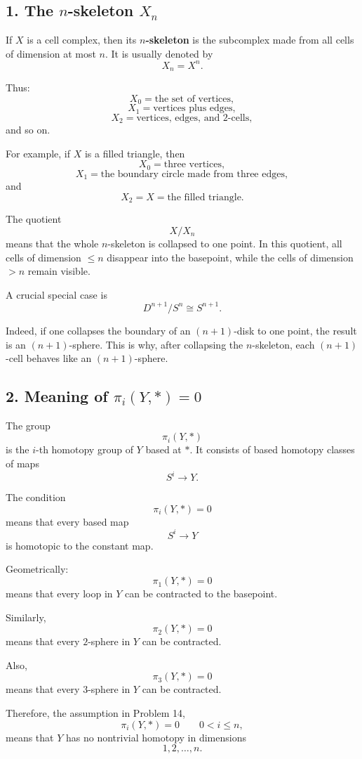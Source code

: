 \documentclass[12pt,a4paper]{article}
\theoremstyle{notespace}
\begin{document}
\subsection*{1. The \(n\)-skeleton \(X_n\)}

If \(X\) is a cell complex, then its \textbf{\(n\)-skeleton} is the subcomplex made from all cells of dimension at most \(n\). It is usually denoted by
\[
X_n=X^n.
\]

Thus:
\[
X_0=\text{the set of vertices},
\]
\[
X_1=\text{vertices plus edges},
\]
\[
X_2=\text{vertices, edges, and \(2\)-cells},
\]
and so on.

For example, if \(X\) is a filled triangle, then
\[
X_0=\text{three vertices},
\]
\[
X_1=\text{the boundary circle made from three edges},
\]
and
\[
X_2=X=\text{the filled triangle}.
\]

The quotient
\[
X/X_n
\]
means that the whole \(n\)-skeleton is collapsed to one point. In this quotient, all cells of dimension \(\leq n\) disappear into the basepoint, while the cells of dimension \(>n\) remain visible.

A crucial special case is
\[
D^{n+1}/S^n\cong S^{n+1}.
\]

Indeed, if one collapses the boundary of an \((n+1)\)-disk to one point, the result is an \((n+1)\)-sphere. This is why, after collapsing the \(n\)-skeleton, each \((n+1)\)-cell behaves like an \((n+1)\)-sphere.

\subsection*{2. Meaning of \(\pi_i(Y,*)=0\)}

The group
\[
\pi_i(Y,*)
\]
is the \(i\)-th homotopy group of \(Y\) based at \(*\). It consists of based homotopy classes of maps
\[
S^i\to Y.
\]

The condition
\[
\pi_i(Y,*)=0
\]
means that every based map
\[
S^i\to Y
\]
is homotopic to the constant map.

Geometrically:
\[
\pi_1(Y,*)=0
\]
means that every loop in \(Y\) can be contracted to the basepoint.

Similarly,
\[
\pi_2(Y,*)=0
\]
means that every \(2\)-sphere in \(Y\) can be contracted.

Also,
\[
\pi_3(Y,*)=0
\]
means that every \(3\)-sphere in \(Y\) can be contracted.

Therefore, the assumption in Problem 14,
\[
\pi_i(Y,*)=0
\qquad
0<i\leq n,
\]
means that \(Y\) has no nontrivial homotopy in dimensions
\[
1,2,\ldots,n.
\]
\end{document}
